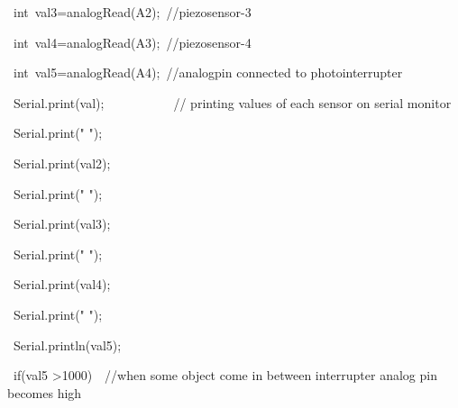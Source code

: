 \documentclass[12pt]{article}
\begin{document}
{\fontsize{14pt}{16.8pt}\selectfont \  int\ val3=analogRead(A2);\   //piezosensor-3\par}\par

{\fontsize{14pt}{16.8pt}\selectfont \  int\ val4=analogRead(A3);\   //piezosensor-4\par}\par

{\fontsize{14pt}{16.8pt}\selectfont \  int\ val5=analogRead(A4);\   //analogpin connected to photointerrupter\par}\par

{\fontsize{14pt}{16.8pt}\selectfont \  Serial.print(val);\tab \ \ \ \ \ \ \ \ \ \ \ // printing  values of each sensor on serial monitor\par}\par

{\fontsize{14pt}{16.8pt}\selectfont \  Serial.print(" ");\par}\par

{\fontsize{14pt}{16.8pt}\selectfont \  Serial.print(val2);\par}\par

{\fontsize{14pt}{16.8pt}\selectfont \  Serial.print(" ");\par}\par

{\fontsize{14pt}{16.8pt}\selectfont \  Serial.print(val3);\par}\par

{\fontsize{14pt}{16.8pt}\selectfont \  Serial.print(" ");\par}\par

{\fontsize{14pt}{16.8pt}\selectfont \  Serial.print(val4);\par}\par

{\fontsize{14pt}{16.8pt}\selectfont \  Serial.print(" ");\par}\par

{\fontsize{14pt}{16.8pt}\selectfont \  Serial.println(val5);\par}\par


\vspace{\baselineskip}
{\fontsize{14pt}{16.8pt}\selectfont \  if(val5 \textgreater 1000)\ \  //when some object come in between interrupter analog pin becomes high\par}\par
\end{document}

